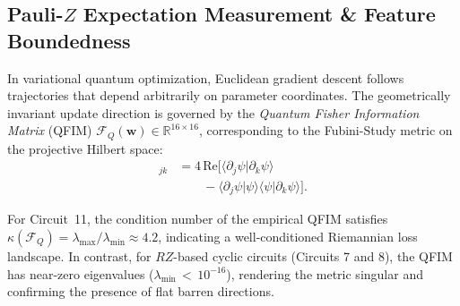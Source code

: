 \documentclass[pdflatex,sn-mathphys-num]{sn-jnl}%
\theoremstyle{thmstyleone}%
\theoremstyle{thmstyletwo}%
\theoremstyle{thmstylethree}%
\begin{document}
\subsection{Pauli-$Z$ Expectation Measurement \& Feature Boundedness}
In variational quantum optimization, Euclidean gradient descent follows trajectories that depend arbitrarily on parameter coordinates. The geometrically invariant update direction is governed by the \textit{Quantum Fisher Information Matrix} (QFIM) $\mathcal{F}_Q(\mathbf{w}) \in \mathbb{R}^{16 \times 16}$, corresponding to the Fubini-Study metric on the projective Hilbert space:
\begin{align}
[\mathcal{F}_Q]_{jk} &= 4 \, \mathrm{Re}\Big[ \langle \partial_j \psi | \partial_k \psi \rangle \nonumber \\
&\qquad - \langle \partial_j \psi | \psi \rangle \langle \psi | \partial_k \psi \rangle \Big].
\label{eq:qfim_definition}
\end{align}

For Circuit~11, the condition number of the empirical QFIM satisfies $\kappa(\mathcal{F}_Q) = \lambda_{\max}/\lambda_{\min} \approx 4.2$, indicating a well-conditioned Riemannian loss landscape. In contrast, for $RZ$-based cyclic circuits (Circuits 7 and 8), the QFIM has near-zero eigenvalues ($\lambda_{\min} \,{<}\, 10^{-16}$), rendering the metric singular and confirming the presence of flat barren directions.
\end{document}
